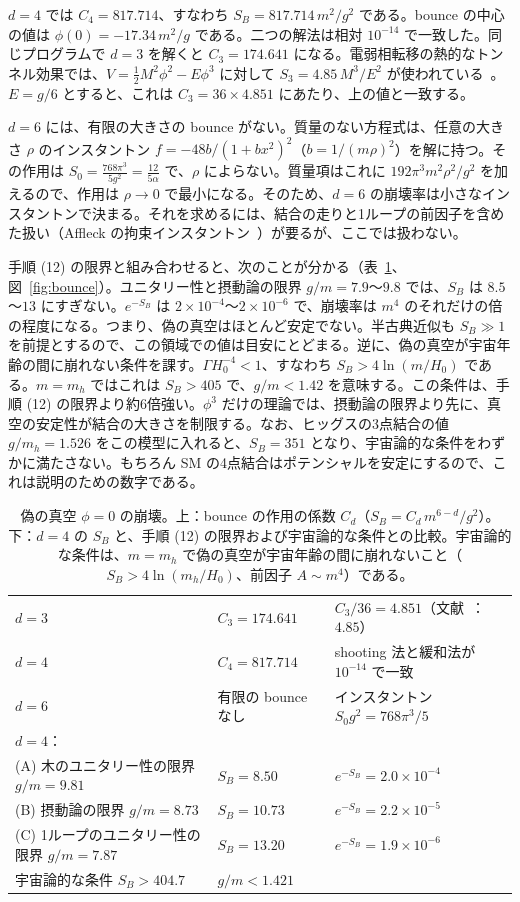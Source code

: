 \documentclass[a4paper,10pt]{ltjsarticle}
\begin{document}
$d=4$ では $C_4=817.714$、すなわち $S_B=817.714\,m^2/g^2$ である。bounce の中心の値は $\phi(0)=-17.34\,m^2/g$ である。二つの解法は相対 $10^{-14}$ で一致した。同じプログラムで $d=3$ を解くと $C_3=174.641$ になる。電弱相転移の熱的なトンネル効果では、$V=\frac12M^2\phi^2-E\phi^3$ に対して $S_3=4.85\,M^3/E^2$ が使われている~\cite{dine92}。$E=g/6$ とすると、これは $C_3=36\times4.851$ にあたり、上の値と一致する。

$d=6$ には、有限の大きさの bounce がない。質量のない方程式は、任意の大きさ $\rho$ のインスタントン $f=-48b/(1+bx^2)^2$（$b=1/(m\rho)^2$）を解に持つ。その作用は $S_0=\frac{768\pi^3}{5g^2}=\frac{12}{5\alpha}$ で、$\rho$ によらない。質量項はこれに $192\pi^3m^2\rho^2/g^2$ を加えるので、作用は $\rho\to0$ で最小になる。そのため、$d=6$ の崩壊率は小さなインスタントンで決まる。それを求めるには、結合の走りと1ループの前因子を含めた扱い（Affleck の拘束インスタントン~\cite{affleck}）が要るが、ここでは扱わない。

手順 (12) の限界と組み合わせると、次のことが分かる（表~\ref{tab:bounce}、図~\ref{fig:bounce}）。ユニタリー性と摂動論の限界 $g/m=7.9$〜$9.8$ では、$S_B$ は $8.5$〜$13$ にすぎない。$e^{-S_B}$ は $2\times10^{-4}$〜$2\times10^{-6}$ で、崩壊率は $m^4$ のそれだけの倍の程度になる。つまり、偽の真空はほとんど安定でない。半古典近似も $S_B\gg1$ を前提とするので、この領域での値は目安にとどまる。逆に、偽の真空が宇宙年齢の間に崩れない条件を課す。$\Gamma H_0^{-4}<1$、すなわち $S_B>4\ln(m/H_0)$ である。$m=m_h$ ではこれは $S_B>405$ で、$g/m<1.42$ を意味する。この条件は、手順 (12) の限界より約6倍強い。$\phi^3$ だけの理論では、摂動論の限界より先に、真空の安定性が結合の大きさを制限する。なお、ヒッグスの3点結合の値 $g/m_h=1.526$ をこの模型に入れると、$S_B=351$ となり、宇宙論的な条件をわずかに満たさない。もちろん SM の4点結合はポテンシャルを安定にするので、これは説明のための数字である。

\begin{table}[tbp]
\centering\small
\caption{偽の真空 $\phi=0$ の崩壊。上：bounce の作用の係数 $C_d$（$S_B=C_d\,m^{6-d}/g^2$）。下：$d=4$ の $S_B$ と、手順 (12) の限界および宇宙論的な条件との比較。宇宙論的な条件は、$m=m_h$ で偽の真空が宇宙年齢の間に崩れないこと（$S_B>4\ln(m_h/H_0)$、前因子 $A\sim m^4$）である。}
\label{tab:bounce}
\begin{tabular}{lll}
\toprule
$d=3$ & $C_3=174.641$ & $C_3/36=4.851$（文献~\cite{dine92}：$4.85$） \\
$d=4$ & $C_4=817.714$ & shooting 法と緩和法が $10^{-14}$ で一致 \\
$d=6$ & 有限の bounce なし & インスタントン $S_0g^2=768\pi^3/5$ \\
\midrule
\multicolumn{3}{l}{$d=4$：} \\
(A) 木のユニタリー性の限界 $g/m=9.81$ & $S_B=8.50$ & $e^{-S_B}=2.0\times10^{-4}$ \\
(B) 摂動論の限界 $g/m=8.73$ & $S_B=10.73$ & $e^{-S_B}=2.2\times10^{-5}$ \\
(C) 1ループのユニタリー性の限界 $g/m=7.87$ & $S_B=13.20$ & $e^{-S_B}=1.9\times10^{-6}$ \\
宇宙論的な条件 $S_B>404.7$ & $g/m<1.421$ & \\
\bottomrule
\end{tabular}
\end{table}
\end{document}
